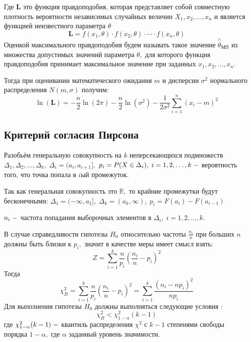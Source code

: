 \documentclass[12pt]{article}
\begin{document}
Где $\mathbf{L}$ это функция правдоподобия, которая представляет собой совместную плотность вероятности независимых случайных величин $X_1,x_2,\ldots,x_n$ и является функцией неизвестного параметра $\theta$
\begin{equation}
    \mathbf{L} = f(x_1,\theta)\cdot f(x_2,\theta)\cdot\cdots\cdot f(x_n,\theta)
\end{equation}
Оценкой максимального правдоподобия будем называть такое значение $\overset{\wedge}{\theta}_{\text{МП}}$ из множества допустимых значений параметра $\theta,$ для которого функция правдоподобия принимает максимальное значение при заданных $x_1,x_2,\ldots,x_n.$

Тогда при оценивании математического ожидания $m$ и дисперсии $\sigma^2$ нормального распределения $N(m,\sigma)$ получим:
\begin{equation}
    \ln(\mathbf{L})=-\frac{n}{2}\ln(2\pi)-\frac{n}{2}\ln\left(\sigma^2\right)-\frac{1}{2\sigma^2}\sum\limits_{i=1}^n(x_i-m)^2
\end{equation}

\subsection{Критерий согласия Пирсона}
Разобьём генеральную совокупность на $k$ неперсекающихся подмножеств $\Delta_1, \Delta_2,\ldots, \Delta_k,\;\Delta_i = (a_i,a_{i+1}],$ $p_i = P(X\in\Delta_i),\;i=1,2,\ldots,k\; \--$ вероятность того, что точка попала в $i$ый промежуток.

Так как генеральная совокупность это $\mathbb{R},$ то крайние промежутки будут бесконечными: $\Delta_1=(-\infty,a_1],\;\Delta_k=(a_k,\infty),\;p_i = F(a_i)-F(a_{i-1})$

$n_i\;\--$ частота попадания выборочных элементов в $\Delta_i,\;i=1,2,\ldots,k.$

В случае справедливости гипотезы $H_0$ относительно частоты $\frac{n_i}{n}$ при больших $n$ должны быть близки к $p_i,$ значит в качестве меры имеет смысл взять: 
\begin{equation}
    Z = \sum\limits_{i=1}^k\frac{n}{p_i}\left(\frac{n_i}{n}-p_i\right)^2
\end{equation}
Тогда
\begin{equation}
    \chi^2_B=\sum\limits_{i=1}^k\frac{n}{p_i}\left(\frac{n_i}{n}-p_i\right)^2=\sum\limits_{i=1}^k\frac{(n_i-np_i)^2}{np_i}
\end{equation}
Для выполнения гипотезы $H_0$ должны выполняться следующие условия \cite{7_2}:
\begin{equation}
    \chi_B^2 < \chi_{1-\alpha}^2(k-1)
\end{equation}
где $\chi_{1-\alpha}^2(k-1)\;\--$ квантиль распределения $\chi^2$ с $k-1$ степенями свободы порядка $1-\alpha,$ где $\alpha$ заданный уровень значимости.
\end{document}
